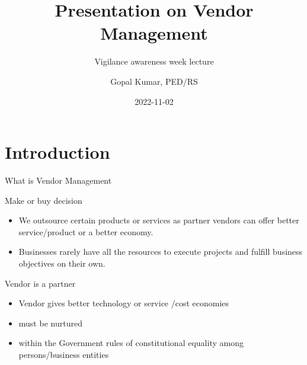 \documentclass[
  10pt,
  ignorenonframetext,
  aspectratio=43,
]{beamer}
\title{Presentation on Vendor Management}
\subtitle{Vigilance awareness week lecture}
\author{Gopal Kumar, PED/RS}
\date{2022-11-02}
\institute{RDSO, Lucknow}
\providecommand{\tightlist}{%
  \setlength{\itemsep}{0pt}\setlength{\parskip}{0pt}}
\begin{document}
\frame{\titlepage}

\begin{frame}[allowframebreaks]
  \tableofcontents[hideallsubsections]
\end{frame}
\hypertarget{introduction}{%
\section{Introduction}\label{introduction}}

\begin{frame}{What is Vendor Management}
\protect\hypertarget{what-is-vendor-management}{}
\begin{block}{Make or buy decision}
\protect\hypertarget{make-or-buy-decision}{}
\begin{itemize}
\tightlist
\item
  We outsource certain products or services as partner vendors can offer
  better service/product or a better economy.
\item
  Businesses rarely have all the resources to execute projects and
  fulfill business objectives on their own.
\end{itemize}
\end{block}

\begin{block}{Vendor is a partner}
\protect\hypertarget{vendor-is-a-partner}{}
\begin{itemize}
\tightlist
\item
  Vendor gives better technology or service /cost economies
\item
  must be nurtured
\item
  within the Government rules of constitutional equality among
  persons/business entities
\end{itemize}
\end{block}
\end{frame}
\end{document}
